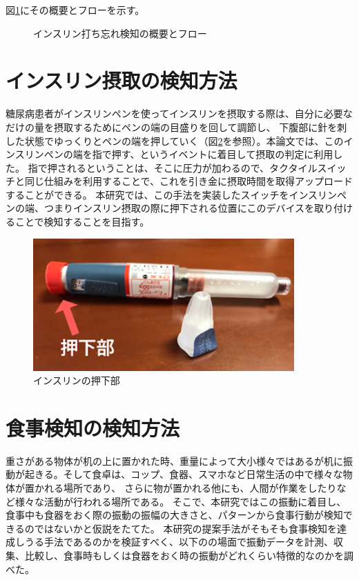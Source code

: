 図\ref{fig:insulin_design}にその概要とフローを示す。

\begin{figure}[htbp]
  \caption{インスリン打ち忘れ検知の概要とフロー}
  \label{fig:insulin_design}
  \begin{center}
  \end{center}
\end{figure}

\section{インスリン摂取の検知方法}

糖尿病患者がインスリンペンを使ってインスリンを摂取する際は、自分に必要なだけの量を摂取するためにペンの端の目盛りを回して調節し、
下腹部に針を刺した状態でゆっくりとペンの端を押していく（図\ref{fig:insulin_pen_push}を参照）。本論文では、このインスリンペンの端を指で押す、というイベントに着目して摂取の判定に利用した。
指で押されるということは、そこに圧力が加わるので、タクタイルスイッチ\cite{tactile_switch}と同じ仕組みを利用することで、これを引き金に摂取時間を取得アップロードすることができる。
本研究では、この手法を実装したスイッチをインスリンペンの端、つまりインスリン摂取の際に押下される位置にこのデバイスを取り付けることで検知することを目指す。

\begin{figure}[htbp]
  \caption{インスリンの押下部}
  \label{fig:insulin_pen_push}
  \begin{center}
    \includegraphics[bb=0 0 1300 1000,width=10cm]{assets/insulin_pen_push.png}
  \end{center}
\end{figure}

\section{食事検知の検知方法}

重さがある物体が机の上に置かれた時、重量によって大小様々ではあるが机に振動が起きる。そして食卓は、コップ、食器、スマホなど日常生活の中で様々な物体が置かれる場所であり、
さらに物が置かれる他にも、人間が作業をしたりなど様々な活動が行われる場所である。
そこで、本研究ではこの振動に着目し、食事中も食器をおく際の振動の振幅の大きさと、パターンから食事行動が検知できるのではないかと仮説をたてた。
本研究の提案手法がそもそも食事検知を達成しうる手法であるのかを検証すべく、以下のの場面で振動データを計測、収集、比較し、食事時もしくは食器をおく時の振動がどれくらい特徴的なのかを調べた。

